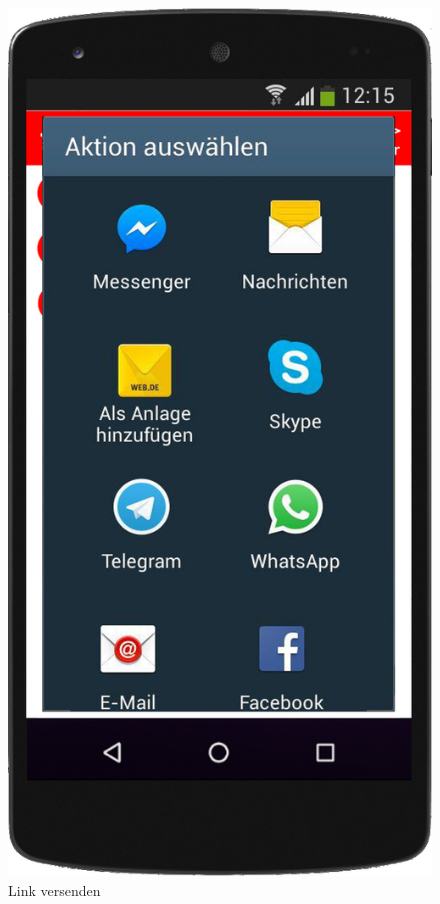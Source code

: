 \begin{figure}
	\caption{Link versenden}
	\includegraphics[scale =0.2]{resources/images/handy/link_versenden.png}
\end{figure}

